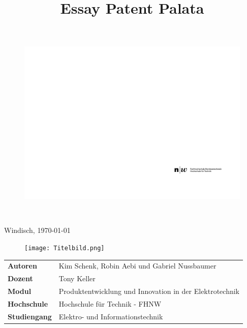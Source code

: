 \documentclass[final]{fhnwreport}       %
\title{Essay Patent Palata}  		        %
\begin{document}
\thispagestyle{empty}
	\begin{figure}
		 \vspace*{-\topskip}\vspace*{-\headsep}
		\includegraphics[scale=1]{graphics/fhnw_ht_logo_de.pdf}
	\end{figure}

	
	\begin{center}
		\vspace*{2cm}
		{\huge{\textbf{\thetitle}}}\\
		\vspace*{0.5cm}
		
		 
		\Large{Windisch, \today}
		
		\vspace*{-1cm}						    %
		\vfill
		\begin{figure}[H]
		\centering
		\texttt{[image: Titelbild.png]}
		\end{figure}
		
	
		\vfill
		
		\begin{normalsize}
			{
			\renewcommand\arraystretch{2}
			\begin{tabular}{>{\bf}p{4cm} l}
			Autoren   		           & Kim Schenk, Robin Aebi und	Gabriel Nussbaumer\\
			Dozent                 &    Tony Keller\\
			Modul		               &    Produktentwicklung und Innovation in der Elektrotechnik\\
			Hochschule                 &    Hochschule für Technik - FHNW\\
			Studiengang                &    Elektro- und Informationstechnik\\
			\end{tabular}
			}
		\end{normalsize}
	\end{center}
\clearpage
			
\end{document}
